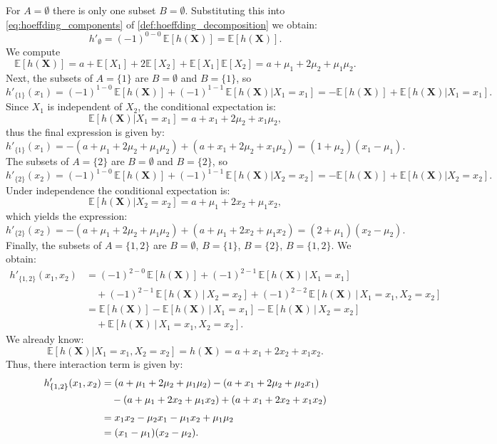 For $A=\emptyset$ there is only one subset $B=\emptyset$. 
Substituting this into \autoref{eq:hoeffding_components} of \autoref{def:hoeffding_decomposition} we obtain:
\[
h'_{\emptyset}
=
(-1)^{0-0}\,
\mathbb{E}[h(\boldsymbol{X})]
=
\mathbb{E}[h(\boldsymbol{X})].
\]
We compute
\[
\mathbb{E}[h(\boldsymbol{X})]
= a + \mathbb{E}[X_1] + 2 \mathbb{E}[X_2] 
  + \mathbb{E}[X_1]\mathbb{E}[X_2]
= a + \mu_1 + 2\mu_2 + \mu_1\mu_2.
\]
Next, the subsets of $A=\{1\}$ are $B=\emptyset$ and $B=\{1\}$, so
\[
h'_{\{1\}}(x_1)
=
(-1)^{1-0}\,\mathbb{E}[h(\boldsymbol{X})]
+
(-1)^{1-1}\,\mathbb{E}[h(\boldsymbol{X})|X_1 = x_1]
=
-\mathbb{E}[h(\boldsymbol{X})] + \mathbb{E}[h(\boldsymbol{X})|X_1 = x_1].
\]
Since $X_1$ is independent of $X_2$, the conditional expectation is:
\[
\mathbb{E}[h(\boldsymbol{X})|X_1 = x_1]
= a + x_1 + 2\mu_2 + x_1 \mu_2,
\]
thus the final expression is given by:
\[
h'_{\{1\}}(x_1)
= - (a+\mu_1+2\mu_2+\mu_1\mu_2) + (a+x_1+2\mu_2+x_1\mu_2)
= (1+\mu_2)(x_1 - \mu_1).
\]
The subsets of $A=\{2\}$ are $B=\emptyset$ and $B=\{2\}$, so
\[
h'_{\{2\}}(x_2)
=
(-1)^{1-0}\,\mathbb{E}[h(\boldsymbol{X})]
+
(-1)^{1-1}\,\mathbb{E}[h(\boldsymbol{X})|X_2 = x_2]
=
-\mathbb{E}[h(\boldsymbol{X})] + \mathbb{E}[h(\boldsymbol{X})|X_2 = x_2].
\]
Under independence the conditional expectation is:
\[
\mathbb{E}[h(\boldsymbol{X})|X_2 = x_2]
= a + \mu_1 + 2x_2 + \mu_1 x_2,
\]
which yields the expression:
\[
h'_{\{2\}}(x_2)
= - (a+\mu_1+2\mu_2+\mu_1\mu_2) + (a+\mu_1+2x_2+\mu_1 x_2)
= (2+\mu_1)(x_2 - \mu_2).
\]
Finally, the subsets of $A=\{1,2\}$ are 
$B=\emptyset$, $B=\{1\}$, $B=\{2\}$, $B=\{1,2\}$. 
We obtain:
\begin{align*}
h'_{\{1,2\}}(x_1,x_2)
  &= (-1)^{2-0}\,\mathbb{E}[h(\boldsymbol{X})]
     + (-1)^{2-1}\,\mathbb{E}[h(\boldsymbol{X})\,|\,X_1=x_1] \\
  &\quad + (-1)^{2-1}\,\mathbb{E}[h(\boldsymbol{X})\,|\,X_2=x_2]
     + (-1)^{2-2}\,\mathbb{E}[h(\boldsymbol{X})\,|\,X_1=x_1,X_2=x_2] \\[0.3em]
  &= \mathbb{E}[h(\boldsymbol{X})]
     - \mathbb{E}[h(\boldsymbol{X})\,|\,X_1=x_1]
     - \mathbb{E}[h(\boldsymbol{X})\,|\,X_2=x_2] \\
  &\quad + \mathbb{E}[h(\boldsymbol{X})\,|\,X_1=x_1,X_2=x_2].
\end{align*}
We already know:
\[
\mathbb{E}[h(\boldsymbol{X})|X_1 = x_1,X_2 = x_2] = h(\boldsymbol{X}) = a + x_1 + 2x_2 + x_1 x_2.
\]
Thus, there interaction term is given by:
\begin{align*}
h'_{\{1,2\}}(x_1,x_2)
&= (a+\mu_1+2\mu_2+\mu_1\mu_2)
   - (a+x_1+2\mu_2+\mu_2 x_1) \notag\\
&\quad - (a+\mu_1+2x_2+\mu_1 x_2)
   + (a+x_1+2x_2+x_1 x_2) \notag\\[0.3em]
&= x_1 x_2 - \mu_2 x_1 - \mu_1 x_2 + \mu_1 \mu_2 \notag\\
&= (x_1 - \mu_1)(x_2 - \mu_2).
\end{align*}
